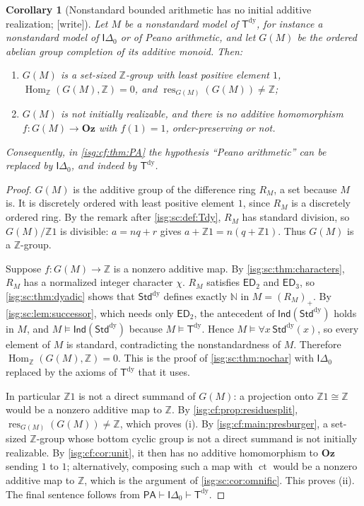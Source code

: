 \documentclass[11pt]{article}
\newtheorem{corollary}[corollary]{Corollary}
\theoremstyle{definition}
\theoremstyle{remark}
\newcommand{\Oz}{\ensuremath{\mathbf{Oz}}}
\newcommand{\Z}{\mathbb{Z}}
\newcommand{\N}{\mathbb{N}}
\newcommand{\ct}{\operatorname{ct}}
\newcommand{\res}{\operatorname{res}}
\newcommand{\StdDy}{\mathsf{Std}^{\mathrm{dy}}}
\newcommand{\Tdy}{\mathsf{T}^{\mathrm{dy}}}
\newcommand{\Ind}{\mathsf{Ind}}
\newcommand{\ED}{\mathsf{ED}}
\newcommand{\Hom}{\operatorname{Hom}}
\newcommand{\Idelta}{\mathsf{I}\Delta_0}
\begin{document}
\begin{corollary}[Nonstandard bounded arithmetic has no initial additive realization; \textup{[write]}]\label{isg:sc:cor:fragment}
Let $M$ be a nonstandard model of $\Tdy$, for instance a nonstandard model
of $\Idelta$ or of Peano arithmetic, and let $G(M)$ be the ordered abelian
group completion of its additive monoid. Then:
\begin{enumerate}[label=\textup{(\roman*)}]
\item $G(M)$ is a set-sized $\Z$-group with least positive element $1$,
      $\Hom_{\Z}(G(M),\Z)=0$, and $\res_{G(M)}(G(M))\ne\Z$;
\item $G(M)$ is not initially realizable, and there is no additive
      homomorphism $f:G(M)\to\Oz$ with $f(1)=1$, order-preserving or not.
\end{enumerate}
Consequently, in \cref{isg:cf:thm:PA} the hypothesis ``Peano arithmetic''
can be replaced by $\Idelta$, and indeed by $\Tdy$.
\end{corollary}
\begin{proof}
$G(M)$ is the additive group of the difference ring $R_M$, a set because
$M$ is. It is discretely ordered with least positive element $1$, since
$R_M$ is a discretely ordered ring. By the remark after
\cref{isg:sc:def:Tdy}, $R_M$ has standard division, so $G(M)/\Z1$ is
divisible: $a=nq+r$ gives $a+\Z1=n(q+\Z1)$. Thus $G(M)$ is a $\Z$-group.

Suppose $f:G(M)\to\Z$ is a nonzero additive map. By
\cref{isg:sc:thm:characters}, $R_M$ has a normalized integer character
$\chi$. $R_M$ satisfies $\ED_2$ and $\ED_3$, so \cref{isg:sc:thm:dyadic}
shows that $\StdDy$ defines exactly $\N$ in $M=(R_M)_+$. By
\cref{isg:sc:lem:successor}, which needs only $\ED_2$, the antecedent of
$\Ind(\StdDy)$ holds in $M$, and $M\models\Ind(\StdDy)$ because
$M\models\Tdy$. Hence $M\models\forall x\,\StdDy(x)$, so every element of
$M$ is standard, contradicting the nonstandardness of $M$. Therefore
$\Hom_{\Z}(G(M),\Z)=0$. This is the proof of \cref{isg:sc:thm:nochar}
with $\Idelta$ replaced by the axioms of $\Tdy$ that it uses.

In particular $\Z1$ is not a direct summand of $G(M)$: a projection onto
$\Z1\cong\Z$ would be a nonzero additive map to $\Z$. By
\cref{isg:cf:prop:residuesplit}, $\res_{G(M)}(G(M))\ne\Z$, which proves
(i). By \cref{isg:cf:main:presburger}, a set-sized $\Z$-group whose bottom
cyclic group is not a direct summand is not initially realizable. By
\cref{isg:cf:cor:unit}, it then has no additive homomorphism to $\Oz$
sending $1$ to $1$; alternatively, composing such a map with $\ct$ would be
a nonzero additive map to $\Z$, which is the argument of
\cref{isg:sc:cor:omnific}. This proves (ii). The final sentence follows
from $\mathsf{PA}\vdash\Idelta\vdash\Tdy$.
\end{proof}
\end{document}
